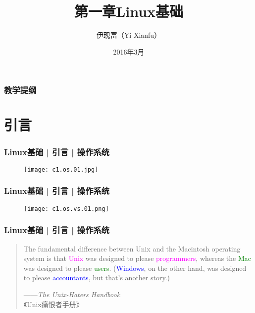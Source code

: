 



\title[Linux基础]{第一章\quad Linux基础}
\author[Yixf]{伊现富（Yi Xianfu）}
\date{2016年3月}

%

\begin{frame}
  \titlepage
\end{frame}

\begin{frame}[plain]
  \frametitle{教学提纲}
  \setcounter{tocdepth}{3}
  \begin{multicols}{2}
    \tableofcontents
  \end{multicols}
\end{frame}

\section{引言}
\begin{frame}
  \frametitle{Linux基础 | 引言 | 操作系统}
  \begin{figure}
    \centering
    \texttt{[image: c1.os.01.jpg]}
  \end{figure}
\end{frame}

\begin{frame}
  \frametitle{Linux基础 | 引言 | 操作系统}
  \begin{figure}
    \centering
    \texttt{[image: c1.os.vs.01.png]}
  \end{figure}
\end{frame}

\begin{frame}
  \frametitle{Linux基础 | 引言 | 操作系统}
  \begin{quotation}
    The fundamental difference between Unix and the Macintosh operating system is that \textcolor{magenta}{Unix} was designed to please \textcolor{magenta}{programmers}, whereas the \textcolor{green}{Mac} was designed to please \textcolor{green}{users}. (\textcolor{blue}{Windows}, on the other hand, was designed to please \textcolor{blue}{accountants}, but that's another story.)
    \begin{flushright}
      ——\textit{The Unix-Haters Handbook}\\《Unix痛恨者手册》
    \end{flushright}
  \end{quotation}
\end{frame}

